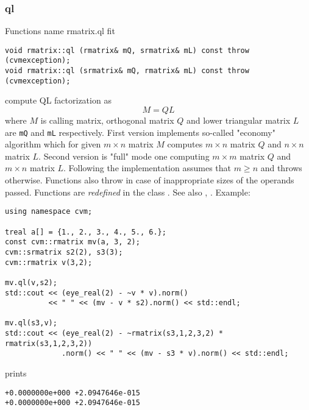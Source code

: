 \subsubsection{ql}
Functions%
\pdfdest name {rmatrix.ql} fit
\begin{verbatim}
void rmatrix::ql (rmatrix& mQ, srmatrix& mL) const throw (cvmexception);
void rmatrix::ql (srmatrix& mQ, rmatrix& mL) const throw (cvmexception);
\end{verbatim}
compute QL factorization as
\begin{equation*}
M=QL
\end{equation*}
where 
$M$ is  calling matrix, orthogonal matrix $Q$ 
and lower triangular matrix $L$ are \verb"mQ" and \verb"mL"
respectively. First version implements so-called "economy" algorithm
which for  given $m\times n$ matrix $M$ computes $m\times n$ matrix $Q$
and $n\times n$ matrix $L$. Second version is  "full" mode one
computing $m\times m$ matrix $Q$ and $m\times n$ matrix $L$.
Following 
the implementation assumes that $m\ge n$ and throws 
otherwise.
Functions also throw
in case of inappropriate sizes of the operands passed.
Functions are \emph{redefined} in the class
.
See also ,
.
Example:
\begin{Verbatim}
using namespace cvm;

treal a[] = {1., 2., 3., 4., 5., 6.};
const cvm::rmatrix mv(a, 3, 2);
cvm::srmatrix s2(2), s3(3);
cvm::rmatrix v(3,2);

mv.ql(v,s2);
std::cout << (eye_real(2) - ~v * v).norm()
          << " " << (mv - v * s2).norm() << std::endl;

mv.ql(s3,v);
std::cout << (eye_real(2) - ~rmatrix(s3,1,2,3,2) * rmatrix(s3,1,2,3,2))
             .norm() << " " << (mv - s3 * v).norm() << std::endl;
\end{Verbatim}
prints
\begin{Verbatim}
+0.0000000e+000 +2.0947646e-015
+0.0000000e+000 +2.0947646e-015
\end{Verbatim}
\newpage



